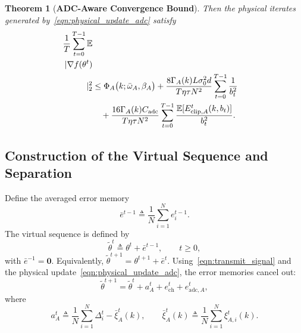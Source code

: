 \documentclass[conference]{IEEEtran}
\newtheorem{theorem}{Theorem}
\begin{document}
\begin{theorem}[\bf ADC-Aware Convergence Bound]
    Then the physical iterates generated by~\eqref{eqn:physical_update_adc} satisfy
    \begin{align}
        \label{eqn:final_adc_convergence_bound_theorem}
        \frac1T\sum_{t=0}^{T-1}\mathbb{E}\\|\nabla f(\theta^t)\\|_2^2
        &\le
        \Phi_A\big(k;\bar{\omega}_A,\beta_A\big)
        +
        \frac{8\Gamma_A(k)L\sigma_0^2d}{T\eta\tau N^2}
        \sum_{t=0}^{T-1}\frac1{b_t^2}
        \notag\\
        &\quad+
        \frac{16\Gamma_A(k)C_{\mathrm{adc}}}{T\eta\tau N^2}
        \sum_{t=0}^{T-1}
        \frac{\mathbb{E}[E_{\mathrm{clip},A}^t(k,b_t)]}{b_t^2}.
    \end{align}
\end{theorem}

\subsection{Construction of the Virtual Sequence and Separation}

Define the averaged error memory
\begin{equation}
    \bar e^{t-1}\triangleq \frac1N\sum_{i=1}^{N}e_i^{t-1}.
\end{equation}
The virtual sequence is defined by
\begin{equation}
    \tilde\theta^t\triangleq \theta^t+\bar e^{t-1},
    \qquad t\ge0,
\end{equation}
with $\bar e^{-1}=\mathbf{0}$. Equivalently, $\tilde\theta^{t+1}=\theta^{t+1}+\bar e^t$. Using~\eqref{eqn:transmit_signal} and the physical update~\eqref{eqn:physical_update_adc}, the error memories cancel out:
\begin{equation}
    \tilde\theta^{t+1}
    =\tilde\theta^t+a_A^t+e_{\mathrm{ch}}^t+e_{\mathrm{adc},A}^t,
\end{equation}
where
\begin{equation}
    a_A^t
    \triangleq
    \frac1N\sum_{i=1}^{N}\Delta_i^t-\bar\xi_A^t(k),
    \qquad
    \bar\xi_A^t(k)\triangleq\frac1N\sum_{i=1}^{N}\xi_{A,i}^t(k).
\end{equation}
\end{document}
